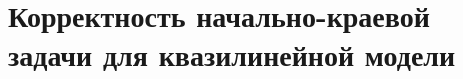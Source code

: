 \section{
    Корректность начально-краевой задачи для квазилинейной модели
}\label{sec:ch3:sec3}

%
%


